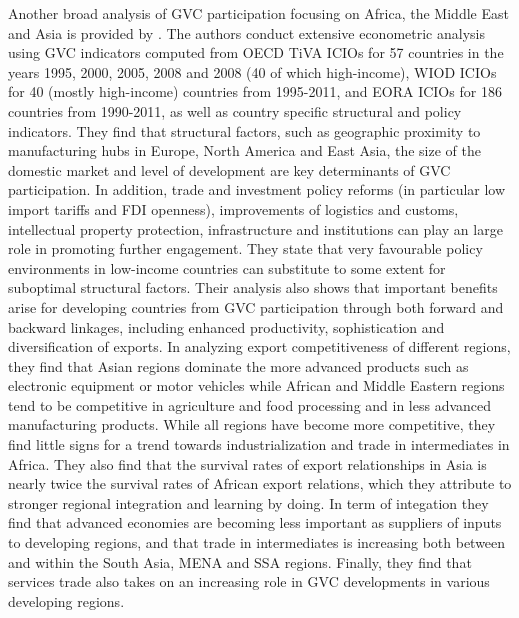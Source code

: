 \documentclass[a4paper]{article}
\begin{document}
Another broad analysis of GVC participation focusing on Africa, the Middle East and Asia is provided by \citet{kowalski2015participation}. The authors conduct extensive econometric analysis using GVC indicators computed from OECD TiVA ICIOs for 57 countries in the years 1995, 2000, 2005, 2008 and 2008 (40 of which high-income), WIOD ICIOs for 40 (mostly high-income) countries from 1995-2011, and EORA ICIOs for 186 countries from 1990-2011, as well as country specific structural and policy indicators. They find that structural factors, such as geographic proximity to manufacturing hubs in Europe, North America and East Asia, the size of the domestic market and level of development are key determinants of GVC participation. In addition, trade and investment policy reforms (in particular low import tariffs and FDI openness), improvements of logistics and customs, intellectual property protection, infrastructure and institutions can play an large role in promoting further engagement. They state that very favourable policy environments in low-income countries can substitute to some extent for suboptimal structural factors. %
Their analysis also shows that important benefits arise for developing countries from GVC participation through both forward and backward linkages, including enhanced productivity, sophistication and diversification of exports. In analyzing export competitiveness of different regions, they find that Asian regions dominate the more advanced products such as electronic equipment or motor vehicles while African and Middle Eastern regions tend to be competitive in agriculture and food processing and in less advanced manufacturing products. %
While all regions have become more competitive, they find little signs for a trend towards industrialization and trade in intermediates in Africa. They also find that the survival rates of export relationships in Asia is nearly twice the survival rates of African export relations, which they attribute to stronger regional integration and learning by doing. In term of integation they find that advanced economies are becoming less important as suppliers of inputs to developing regions, and that trade in intermediates is increasing both between and within the South Asia, MENA and SSA regions. Finally, they find that services trade also takes on an increasing role in GVC developments in various developing regions. \newline 
\end{document}
